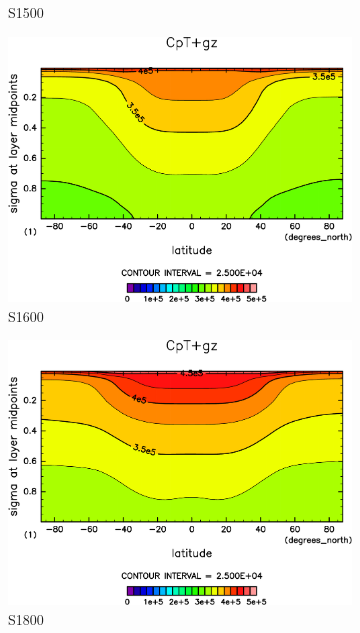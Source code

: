 \documentclass[body]{subfiles}
\begin{document}
\begin{figure}[t]
\begin{subfigure}{.4\textwidth}
		\caption{S1500}\label{CpT+gzS1500}
	\end{subfigure}
	\begin{subfigure}{.4\textwidth}
		\centering
		\includegraphics[width=\columnwidth]{S1600/CpT+gz,time=3650:4015-crop-rotate.pdf}
		\caption{S1600}\label{CpT+gzS1600}
	\end{subfigure}
	\begin{subfigure}{.4\textwidth}
		\centering
		\includegraphics[width=\columnwidth]{S1800/CpT+gz,time=3650:4015-crop-rotate.pdf}
		\caption{S1800}\label{CpT+gzS1800}
	\end{subfigure}
	\begin{subfigure}{.4\textwidth}

\end{subfigure}
\end{figure}
\end{document}
